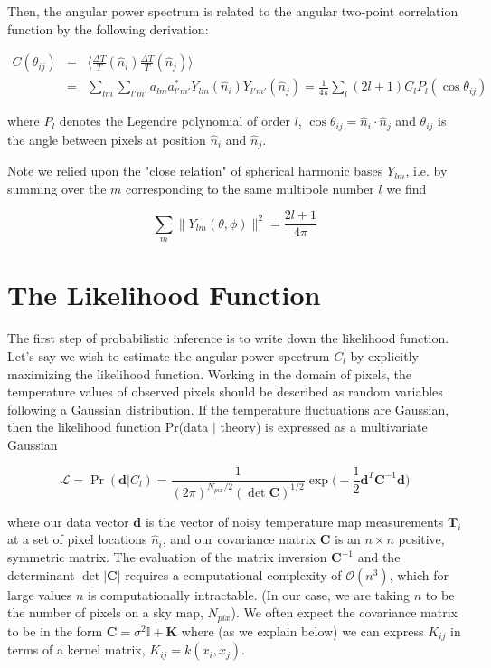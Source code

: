 \documentclass[12pt]{article}
\begin{document}
Then, the angular power spectrum is related to the angular two-point correlation function by the following derivation:


\begin{eqnarray*}
C(\theta_{ij}) & = & \langle \frac{\Delta T}{T}(\hat{n}_i)\frac{\Delta T}{T}(\hat{n}_j)\rangle \\
& = & \sum\limits_{lm}\sum\limits_{l'm'}a_{lm}a_{l'm'}^{*}Y_{lm}(\hat{n}_i)Y_{l'm'}(\hat{n}_j)
=\frac{1}{4\pi}\sum\limits_{l}(2l+1)C_l P_l (\cos\theta_{ij})
\end{eqnarray*}



where $P_l$ denotes the Legendre polynomial of order $l$,  $\cos\theta_{ij}=\hat{n}_i\cdot\hat{n}_j$
and $\theta_{ij}$ is the angle between pixels at position $\hat{n}_i$ and $\hat{n}_j$. 

Note we relied upon the "close relation" of spherical harmonic bases $Y_{lm}$, i.e. by summing over the $m$ corresponding to the same multipole number $l$ we find

\begin{equation}
\sum_m\|Y_{lm}(\theta, \phi)\|^2=\frac{2l+1}{4\pi}
\end{equation}



\section{The Likelihood Function}
The first step of probabilistic inference is to write down the likelihood function. Let's say we wish to estimate the angular power spectrum $C_l$ by explicitly maximizing the likelihood function. Working in the domain of pixels, the temperature values of observed pixels should be described as random variables following a Gaussian distribution. If the temperature fluctuations are Gaussian, then the likelihood function Pr(data $\rvert$ theory) is expressed as a multivariate Gaussian 

\begin{equation}
\mathcal{L}=\Pr(\textbf{d}\rvert C_l)=\frac{1}{(2\pi)^{N_{pix}/2}(\det\textbf{C})^{1/2}}\exp{\Big(-\frac{1}{2}\textbf{d}^{T}\textbf{C}^{-1}\textbf{d}\Big)}
\end{equation}

where our data vector $\textbf{d}$ is the vector of noisy temperature map measurements $\textbf{T}_i$ at a set of pixel locations $\hat{n}_i$, and our covariance matrix $\textbf{C}$ is an $n\times n$ positive, symmetric matrix. The evaluation of the matrix inversion $\textbf{C}^{-1}$ and the determinant $\det{|\textbf{C}|}$ requires a computational complexity of $\mathcal{O}(n^3)$, which for large values $n$ is computationally intractable. (In our case, we are taking $n$ to be the number of pixels on a sky map, $N_{pix}$). We often expect the covariance matrix to be in the form $\textbf{C}=\sigma^2\mathbb{I}+\textbf{K}$ where (as we explain below) we can express $K_{ij}$ in terms of a kernel matrix, $K_{ij}=k(x_i, x_j)$. 
\end{document}
